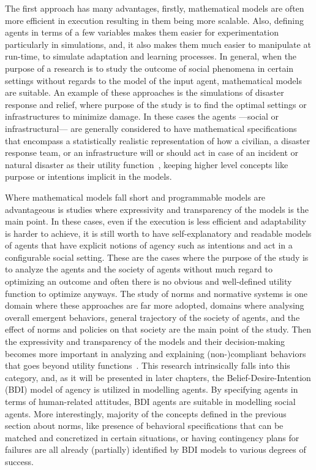 The first approach has many advantages, firstly, mathematical models are often more efficient in execution resulting in them being more scalable. Also, defining agents in terms of a few variables makes them easier for experimentation particularly in simulations, and, it also makes them much easier to manipulate at run-time, to simulate adaptation and learning processes. In general, when the purpose of a research is to study the outcome of social phenomena in certain settings without regards to the model of the input agent, mathematical models are suitable. An example of these approaches is the simulations of disaster response and relief, where purpose of the study is to find the optimal settings or infrastructures to minimize damage. In these cases the agents ---social or infrastructural--- are generally considered to have mathematical specifications that encompass a statistically realistic representation of how a civilian, a disaster response team, or an infrastructure will or should act in case of an incident or natural disaster as their utility function~\cite{arinta2019disaster,khouj2011disaster,chamola2021disaster}, keeping higher level concepts like purpose or intentions implicit in the models.


Where mathematical models fall short and programmable models are advantageous is studies where expressivity and transparency of the models is the main point. In these cases, even if the execution is less efficient and adaptability is harder to achieve, it is still worth to have self-explanatory and readable models of agents that have explicit notions of agency such as intentions and act in a configurable social setting. These are the cases where the purpose of the study is to analyze the agents and the society of agents without much regard to optimizing an outcome and often there is no obvious and well-defined utility function to optimize anyways. The study of norms and normative systems is one domain where these approaches are far more adopted, domains where analysing overall emergent behaviors, general trajectory of the society of agents, and the effect of norms and policies on that society are the main point of the study. Then the expressivity and transparency of the models and their decision-making becomes more important in analyzing and explaining (non-)compliant behaviors that goes beyond utility functions~\cite{van2019governmental}. This research intrinsically falls into this category, and, as it will be presented in later chapters, the Belief-Desire-Intention (BDI) model of agency \cite{Rao1995} is utilized in modelling agents. By specifying agents in terms of human-related attitudes, BDI agents are suitable in modelling social agents. More interestingly, majority of the concepts defined in the previous section about norms, like presence of behavioral specifications that can be matched and concretized in certain situations, or having contingency plans for failures are all already (partially) identified by BDI models to various degrees of success.


